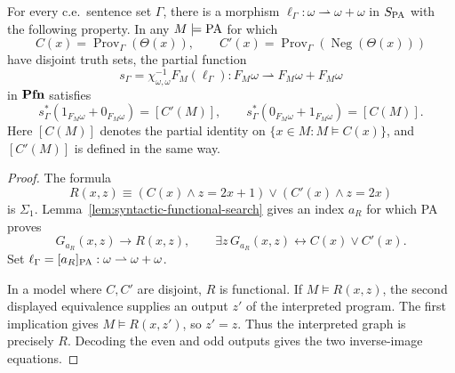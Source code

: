 \begin{lemma}
\label{lem:arithmetic-proof-search}
For every c.e.\ sentence set $\Gamma$, there is a morphism
$\ell_\Gamma:\omega\rightharpoonup\omega+\omega$ in
$S_{\mathrm{PA}}$ with the following property. In any $M\models\mathrm{PA}$
for which
\[
 C(x)=\operatorname{Prov}_\Gamma(\Theta(x)),\qquad
 C'(x)=\operatorname{Prov}_\Gamma(\operatorname{Neg}(\Theta(x)))
\]
have disjoint truth sets, the partial function
\[
 s_\Gamma=\chi_{\omega,\omega}^{-1}F_M(\ell_\Gamma):
       F_M\omega\rightharpoonup F_M\omega+F_M\omega
\]
in $\mathbf{Pfn}$ satisfies
\[
 s_\Gamma^*(1_{F_M\omega}+0_{F_M\omega})=[C'(M)],\qquad
 s_\Gamma^*(0_{F_M\omega}+1_{F_M\omega})=[C(M)].
\]
Here $[C(M)]$ denotes the partial identity on
$\{x\in M:M\models C(x)\}$, and $[C'(M)]$ is defined in the
same way.
\end{lemma}
\begin{proof}
The formula
\[
 R(x,z)\equiv
   (C(x)\land z=2x+1)\lor(C'(x)\land z=2x)
\]
is $\Sigma_1$. Lemma~\ref{lem:syntactic-functional-search}
gives an index $a_R$ for which PA proves
\[
 G_{a_R}(x,z)\longrightarrow R(x,z),\qquad
 \exists z\,G_{a_R}(x,z)\longleftrightarrow C(x)\lor C'(x).
\]
Set $\ell_\Gamma=[a_R]_{\mathrm{PA}}:\omega\rightharpoonup\omega+\omega$.

In a model where $C,C'$ are disjoint, $R$ is functional. If
$M\models R(x,z)$, the second displayed equivalence supplies
an output $z'$ of the interpreted program. The first implication
gives $M\models R(x,z')$, so $z'=z$. Thus the interpreted graph
is precisely $R$. Decoding the even and odd outputs gives the
two inverse-image equations.
\end{proof}


